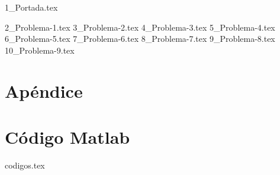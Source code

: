 \documentclass[a4paper,12pt,twoside]{all-in-one} %
\begin{document}
{1_Portada.tex}
{
  \hypersetup{hidelinks}
  \tableofcontents
}
\clearpage

{2_Problema-1.tex}
\FloatBarrier 
\newpage
{3_Problema-2.tex}
\FloatBarrier 
\newpage
{4_Problema-3.tex}
\FloatBarrier 
\newpage
{5_Problema-4.tex}
\FloatBarrier 
\newpage
{6_Problema-5.tex}
\FloatBarrier 
\newpage
{7_Problema-6.tex}
\FloatBarrier 
\newpage
{8_Problema-7.tex}
\FloatBarrier 
\newpage
{9_Problema-8.tex}
\FloatBarrier 
\newpage
{10_Problema-9.tex}
\FloatBarrier 
\newpage

\appendix
\section*{Apéndice} 
\section{Código Matlab} 
{codigos.tex}

\pagestyle{\auxsettings}
\printbibliography[heading=bibintoc]
\end{document}
